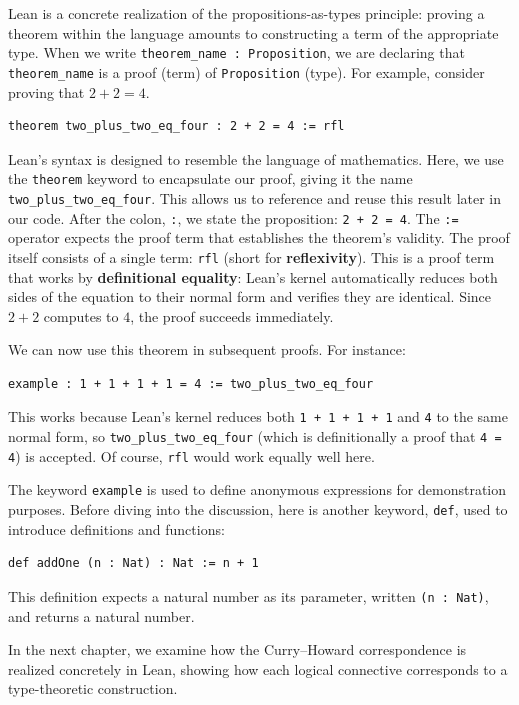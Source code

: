 Lean is a concrete realization of the propositions-as-types principle:
proving a theorem within the language amounts to constructing a term
of the appropriate type.
When we write
\lstinline[language=lean]|theorem_name : Proposition|, we are
declaring that \lstinline[language=lean]|theorem_name| is a proof
(term) of \lstinline[language=lean]|Proposition| (type).
For example, consider proving that $2 + 2 = 4$.
\begin{example}\mbox{}
  \begin{lstlisting}[language=Lean]
    theorem two_plus_two_eq_four : 2 + 2 = 4 := rfl
  \end{lstlisting}
  Lean's syntax is designed to resemble the language of mathematics.
  Here, we use the \lstinline[language=lean]|theorem| keyword to
  encapsulate our proof, giving it the name
  \lstinline[language=lean]|two_plus_two_eq_four|.
  This allows us to reference and reuse this result later in our code.
  After the colon, \lstinline[language=lean]|:|, we state the
  proposition: \lstinline[language=lean]|2 + 2 = 4|.
  The \lstinline[language=lean]|:=| operator expects the proof term
  that establishes the theorem's validity.
  The proof itself consists of a single term:
  \lstinline[language=lean]|rfl| (short for \textbf{reflexivity}).
  This is a proof term that works by \textbf{definitional equality}:
  Lean's kernel automatically reduces both sides of the equation to
  their normal form and verifies they are identical.
  Since $2 + 2$ computes to $4$, the proof succeeds immediately.

  We can now use this theorem in subsequent proofs.
  For instance:
  \begin{lstlisting}[language=Lean]
    example : 1 + 1 + 1 + 1 = 4 := two_plus_two_eq_four
  \end{lstlisting}
  This works because Lean's kernel reduces both
  \lstinline[language=lean]|1 + 1 + 1 + 1| and
  \lstinline[language=lean]|4| to the same normal form, so
  \lstinline[language=lean]|two_plus_two_eq_four| (which is
  definitionally a proof that
  \lstinline[language=lean]|4 = 4|) is accepted.
  Of course, \lstinline[language=lean]|rfl| would work equally well
  here.

  The keyword \lstinline[language=lean]|example| is used to define
  anonymous expressions for demonstration purposes.
  Before diving into the discussion, here is another keyword,
  \lstinline[language=lean]|def|, used to introduce definitions and
  functions:
  \begin{lstlisting}[language=Lean]
    def addOne (n : Nat) : Nat := n + 1
  \end{lstlisting}
  This definition expects a natural number as its parameter, written
  \lstinline[language=lean]|(n : Nat)|, and returns a natural number.
\end{example}

In the next chapter, we examine how the Curry--Howard correspondence
is realized concretely in Lean, showing how each logical connective
corresponds to a type-theoretic construction.